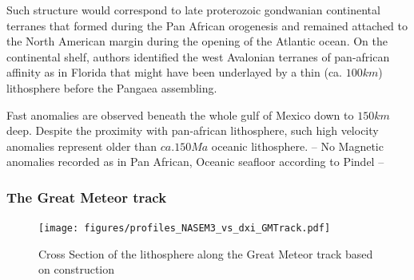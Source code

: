 \documentclass[12pt]{article}
\begin{document}
		Such structure would correspond to late proterozoic gondwanian continental terranes that formed during the Pan African orogenesis \citep{kennedy1964structural} and remained attached to the North American margin during the opening of the Atlantic ocean. \citep[e.g.][]{thomas2006tectonic}
		On the continental shelf, authors \citep[e.g.][]{o1983avalon,nance2002cordilleran} identified the west Avalonian terranes of pan-african affinity as in Florida \citep[see][]{smith1982review} that might have been underlayed by a thin (ca. $100km$) lithosphere before the Pangaea assembling. \citep{mckenzie2015lithospheric}

		Fast anomalies are observed beneath the whole gulf of Mexico down to $150km$ deep. Despite the proximity with pan-african lithosphere, such high velocity anomalies represent older than $ca. 150Ma$ oceanic lithosphere. \citep{muller2008age,pindell2009tectonic}
		-- No Magnetic anomalies recorded as in Pan African, Oceanic seafloor according to Pindel --





\subsubsection{The Great Meteor track}
	\begin{figure}
		\centerline{\texttt{[image: figures/profiles\_NASEM3\_vs\_dxi\_GMTrack.pdf]}}

		\caption{Cross Section of the lithosphere along the Great Meteor track based on \cite{heaman2000timing} construction}
		\label{gmtcross}

	\end{figure}
\end{document}
